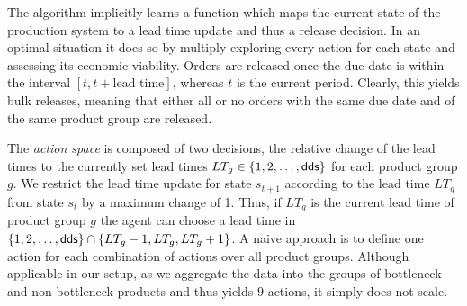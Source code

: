 \documentclass[envcountsame]{llncs}
\begin{document}
The algorithm implicitly learns a function which maps the current state of the production
system to a lead time update and thus a release decision. In an optimal situation it does so by
multiply exploring every action for each state and assessing its economic viability.
%
Orders are released once the due date is within the interval $[t,t+\text{lead time}]$, whereas $t$
is the current period. Clearly, this yields bulk releases, meaning that either all or no orders with
the same due date and of the same product group are
released.

The \textit{action space} is composed of two decisions, the relative change of the lead times to the
currently set lead times $LT_{g} \in \{1,2,\ldots,\textsf{dds}\}$ for each product group $g$.
%
We restrict the lead time update for state $s_{t+1}$ according to the lead time $LT_{g}$ from state
$s_{t}$ by a maximum change of 1. Thus, if $LT_{g}$ is the current lead time of product group $g$
the agent can choose a lead time in $\{1,2,\ldots,\textsf{dds}\} \cap \{LT_{g}-1,LT_{g},LT_{g}+1\}$. %
A naive approach is to define one action for each combination of actions over all product groups.
Although applicable in our setup, as we aggregate the data into the groups of bottleneck and
non-bottleneck products and thus yields \(9\) actions, it simply does not scale.
\end{document}
